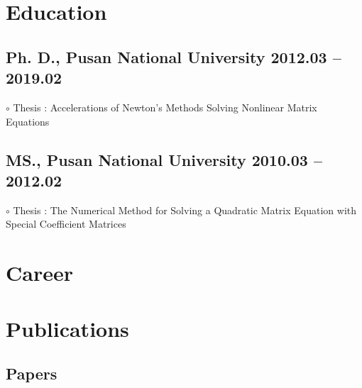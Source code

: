 \documentclass[11pt]{article} %
\newcommand\mycareereng{}
\newcommand\myedueng{
	\subsection*{Ph. D., Pusan National University \hfill 2012.03 -- 2019.02} %
	$\circ$ Thesis : Accelerations of Newton's Methods Solving Nonlinear Matrix Equations
	
	\subsection*{MS., Pusan National University \hfill 2010.03 -- 2012.02} %
	$\circ$ Thesis : The Numerical Method for Solving a Quadratic Matrix Equation with Special Coefficient Matrices
}
\begin{document}
%


\section*{Education}

\myedueng


%


\section*{Career}
\mycareereng

\section*{Publications}

\subsection*{Papers}
\end{document}
